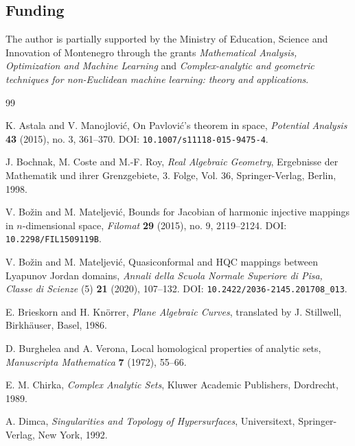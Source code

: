 \documentclass[11pt]{amsart}
\theoremstyle{definition}
\theoremstyle{remark}
\begin{document}
\subsection*{Funding}
The author is partially supported by the Ministry of Education, Science and Innovation of Montenegro through the grants \emph{Mathematical Analysis, Optimization and Machine Learning} and \emph{Complex-analytic and geometric techniques for non-Euclidean machine learning: theory and applications}.

\begin{thebibliography}{99}

K. Astala and V. Manojlovi\'c,
\newblock On Pavlovi\'c's theorem in space,
\newblock \emph{Potential Analysis} \textbf{43} (2015), no. 3, 361--370.
\newblock DOI: \texttt{10.1007/s11118-015-9475-4}.


J. Bochnak, M. Coste and M.-F. Roy,
\newblock \emph{Real Algebraic Geometry},
\newblock Ergebnisse der Mathematik und ihrer Grenzgebiete, 3. Folge, Vol. 36,
\newblock Springer-Verlag, Berlin, 1998.


V. Bo\v zin and M. Mateljevi\'c,
\newblock Bounds for Jacobian of harmonic injective mappings in
\(n\)-dimensional space,
\newblock \emph{Filomat} \textbf{29} (2015), no. 9, 2119--2124.
\newblock DOI: \texttt{10.2298/FIL1509119B}.

V. Bo\v zin and M. Mateljevi\'c,
\newblock Quasiconformal and HQC mappings between Lyapunov Jordan domains,
\newblock \emph{Annali della Scuola Normale Superiore di Pisa, Classe di
Scienze} (5) \textbf{21} (2020), 107--132.
\newblock DOI: \texttt{10.2422/2036-2145.201708\_013}.

E. Brieskorn and H. Kn\"orrer,
\newblock \emph{Plane Algebraic Curves},
\newblock translated by J. Stillwell,
\newblock Birkh\"auser, Basel, 1986.

D. Burghelea and A. Verona,
\newblock Local homological properties of analytic sets,
\newblock \emph{Manuscripta Mathematica} \textbf{7} (1972), 55--66.

E. M. Chirka,
\newblock \emph{Complex Analytic Sets},
\newblock Kluwer Academic Publishers, Dordrecht, 1989.

A. Dimca,
\newblock \emph{Singularities and Topology of Hypersurfaces},
\newblock Universitext,
\newblock Springer-Verlag, New York, 1992.


\end{thebibliography}
\end{document}
